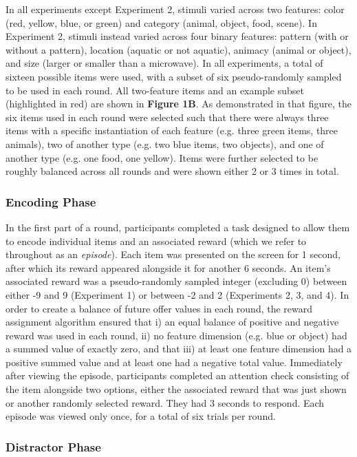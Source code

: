 \documentclass[10pt,letterpaper]{article}
\begin{document}
In all experiments except Experiment 2, stimuli varied across two features: color (red, yellow, blue, or green) and category (animal, object, food, scene). In Experiment 2, stimuli instead varied across four binary features: pattern (with or without a pattern), location (aquatic or not aquatic), animacy (animal or object), and size (larger or smaller than a microwave). In all experiments, a total of sixteen possible items were used, with a subset of six pseudo-randomly sampled to be used in each round. All two-feature items and an example subset (highlighted in red) are shown in \textbf{Figure 1B}. As demonstrated in that figure, the six items used in each round were selected such that there were always three items with a specific instantiation of each feature (e.g. three green items, three animals), two of another type (e.g. two blue items, two objects), and one of another type (e.g. one food, one yellow). Items were further selected to be roughly balanced across all rounds and were shown either 2 or 3 times in total.

\subsubsection{Encoding Phase}

In the first part of a round, participants completed a task designed to allow them to encode individual items and an associated reward (which we refer to throughout as an \textit{episode}). Each item was presented on the screen for 1 second, after which its reward appeared alongside it for another 6 seconds. An item's associated reward was a pseudo-randomly sampled integer (excluding 0) between either -9 and 9 (Experiment 1) or between -2 and 2 (Experiments 2, 3, and 4). In order to create a balance of future offer values in each round, the reward assignment algorithm ensured that i) an equal balance of positive and negative reward was used in each round, ii) no feature dimension (e.g. blue or object) had a summed value of exactly zero, and that iii) at least one feature dimension had a positive summed value and at least one had a negative total value. Immediately after viewing the episode, participants completed an attention check consisting of the item alongside two options, either the associated reward that was just shown or another randomly selected reward. They had 3 seconds to respond. Each episode was viewed only once, for a total of six trials per round.

\subsubsection{Distractor Phase}
\end{document}
